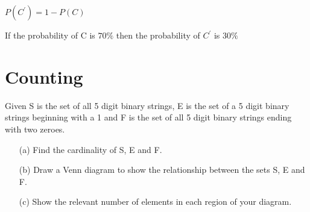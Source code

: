 $P(C^{\prime}) = 1- P(C)$



If the probability of C is $70 \%$ then the probability of $C^{\prime}$ is $30\%$






\section{Counting}
Given S is the set of all 5 digit binary strings, E is the set of a 5 digit
binary strings beginning with a 1 and F is the set of all 5 digit binary strings ending
with two zeroes.
\begin{itemize}
\item[(a)] Find the cardinality of S, E and F.
\item[(b)] Draw a Venn diagram to show the relationship between the sets S, E and F.
\item[(c)] Show the relevant number of elements in each region of your diagram.
\end{itemize}


